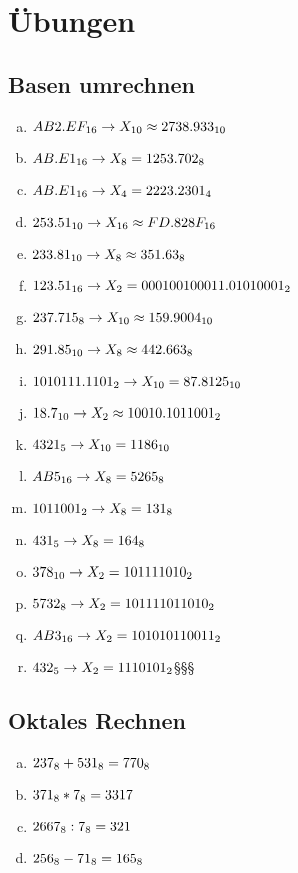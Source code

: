 \documentclass[12pt, a4paper, oneside]{article}
\begin{document}
\newpage
\section{Übungen}
\subsection{Basen umrechnen}
\begin{enumerate}[a.)]
  \item $AB2.EF_{16} \rightarrow X_{10} \hfill \approx 2738.933_{10}$
  \item $AB.E1_{16} \rightarrow X_{8} \hfill = 1253.702_{8}$ 
  \item $AB.E1_{16} \rightarrow X_{4} \hfill = 2223.2301_{4}$
  \item $253.51_{10} \rightarrow X_{16} \hfill \approx FD.828F_{16}$
  \item $233.81_{10} \rightarrow X_{8} \hfill \approx 351.63_{8}$
  \item $123.51_{16} \rightarrow X_{2} \hfill = 0001 0010 0011.0101 0001_{2}$
  \item $237.715_{8} \rightarrow X_{10} \hfill \approx 159.9004_{10}$
  \item $291.85_{10} \rightarrow X_{8} \hfill \approx 442.663_{8}$
  \item $101 0111.1101_{2} \rightarrow X_{10} \hfill = 87.8125_{10}$
  \item $18.7_{10} \rightarrow X_{2} \hfill \approx 1 0010.1011001_{2}$
  \item $4321_{5} \rightarrow X_{10} \hfill = 1186_{10}$
  \item $AB5_{16} \rightarrow X_{8} \hfill = 5265_{8}$
  \item $1011001_{2} \rightarrow X_{8} \hfill = 131_{8}$
  \item $431_{5} \rightarrow X_{8} \hfill = 164_{8}$
  \item $378_{10} \rightarrow X_{2} \hfill = 101111010_{2}$
  \item $5732_{8} \rightarrow X_{2} \hfill = 101111011010_{2}$
  \item $AB3_{16} \rightarrow X_{2} \hfill = 101010110011_{2}$
  \item $432_{5} \rightarrow X_{2} \hfill = 1110101_{2}$§§§
\end{enumerate}

\subsection{Oktales Rechnen}
\begin{enumerate}[a.)]
  \item $237_{8} + 531_{8} \hfill = 770_{8}$ 
  \item $371_{8} * 7_{8} \hfill = 3317$
  \item $2667_{8} : 7_{8} \hfill = 321$
  \item $256_{8} - 71_{8} \hfill = 165_{8}$
\end{enumerate}
\end{document}

